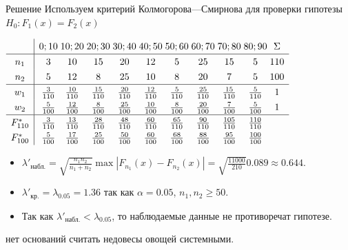 \documentclass[unicode,11pt,notheorems,xcolor=table]{beamer}
\begin{document}
 \begin{frame}{Решение}
    Используем критерий Колмогорова---Смирнова для проверки гипотезы $H_0\colon F_1(x) = F_2(x)$

    {\small\centering
    $
    \color{black}
    \renewcommand{\arraystretch}{1.3}
    \begin{array}{c|c@{\;}c@{\;}c@{\;}c@{\;}c@{\;}c@{\;}c@{\;}c@{\;}c@{\;}c}
        & 0;10 & 10;20 & 20;30 & 30;40 &40;50 &50;60 & 60;70 & 70;80 & 80;90 &\Sigma\\
        \hline
        n_1 & 3    & 10     & 15     & 20     & 12    & 5     & 25     & 15     &  5 &110\\
        n_2 & 5    & 12     & 8      & 25     & 10    & 8     & 20     & 7      &  5 &100\\
        \hline
        w_1 & \frac{3}{110} & \frac{10}{110}     & \frac{15}{110}     & \frac{20}{110}     & \frac{12}{110}    & \frac{5}{110}     & \frac{25}{110}     & \frac{15}{110}     &  \frac{5}{110} & 1\\
        w_2 & \frac{5}{100}    & \frac{12}{100}     & \frac{8}{100}      & \frac{25}{100}     & \frac{10}{100}    & \frac{8}{100}     & \frac{20}{100}     & \frac{7}{100}      &  \frac{5}{100} & 1\\
        \hline
        F^*_{110} & \frac{3}{110} & \frac{13}{110}     & \frac{28}{110}     & \frac{48}{110}     & \frac{60}{110}    & \frac{65}{110}     & \frac{90}{110}     & \frac{105}{110}     &  \frac{110}{110} \\
        F^*_{100} & \frac{5}{100}    & \frac{17}{100}     & \frac{25}{100}      & \frac{50}{100}     & \frac{60}{100}    & \frac{68}{100}     & \frac{88}{100}     & \frac{95}{100}      &  \frac{100}{100} \\
    \end{array}
    $\par}

    \begin{itemize}
        \item $
        \lambda'_\text{набл.} = \sqrt{\frac{n_1n_2}{n_1+n_2}} \max |F_{n_1}(x)-F_{n_2}(x)| =
        \sqrt{\frac{11000}{210}} 0.089\approx 0.644.
        $
        \item  $\lambda'_\text{кр.} =\lambda_{0.05}=1.36$ так как $\alpha=0.05$, $n_1,n_2 \geqslant 50$.
        \item Так как $\lambda'_\text{набл.}< \lambda_{0.05}$, то наблюдаемые данные не противоречат гипотезе.
    \end{itemize}
     нет оснований считать недовесы овощей системными.
 \end{frame}
\end{document}
